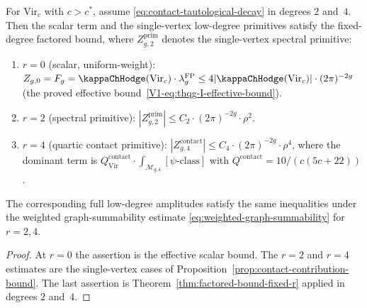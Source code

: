\begin{corollary}
\label{cor:factored-bound-r4}
For $\mathrm{Vir}_c$ with $c > c^*$, assume
\eqref{eq:contact-tautological-decay} in degrees $2$ and~$4$. Then
the scalar term and the single-vertex low-degree primitives satisfy
the fixed-degree factored bound, where $Z_{g,2}^{\mathrm{prim}}$
denotes the single-vertex spectral primitive:
\begin{enumerate}[label=\textup{(\roman*)}]
\item $r = 0$ \textup{(}scalar, uniform-weight\textup{)}: $Z_{g,0} = F_g =
 \kappaChHodge(\mathrm{Vir}_c) \cdot \lambda_g^{\mathrm{FP}} \leq 4|\kappaChHodge(\mathrm{Vir}_c)| \cdot
 (2\pi)^{-2g}$ \textup{(}the proved effective
 bound~\eqref{V1-eq:thqg-I-effective-bound}\textup{)}.
\item $r = 2$ \textup{(}spectral primitive\textup{)}:
$|Z_{g,2}^{\mathrm{prim}}| \leq
 C_2 \cdot (2\pi)^{-2g} \cdot \rho^2$.
\item $r = 4$ \textup{(}quartic contact primitive\textup{)}:
$|Z_{g,4}^{\mathrm{contact}}|
 \leq C_4 \cdot (2\pi)^{-2g} \cdot \rho^4$, where the dominant
 term is
 $Q^{\mathrm{contact}}_{\mathrm{Vir}}
 \cdot \int_{\overline{\mathcal{M}}_{g,4}} [\psi\text{-class}]$
 with $Q^{\mathrm{contact}} = 10/(c(5c+22))$.
\end{enumerate}
The corresponding full low-degree amplitudes satisfy the same
inequalities under the weighted graph-summability estimate
\eqref{eq:weighted-graph-summability} for $r=2,4$.
\end{corollary}

\begin{proof}
At $r=0$ the assertion is the effective scalar bound. The
$r=2$ and $r=4$ estimates are the single-vertex cases of
Proposition~\ref{prop:contact-contribution-bound}. The last assertion
is Theorem~\ref{thm:factored-bound-fixed-r} applied in degrees
$2$ and~$4$.
\end{proof}

